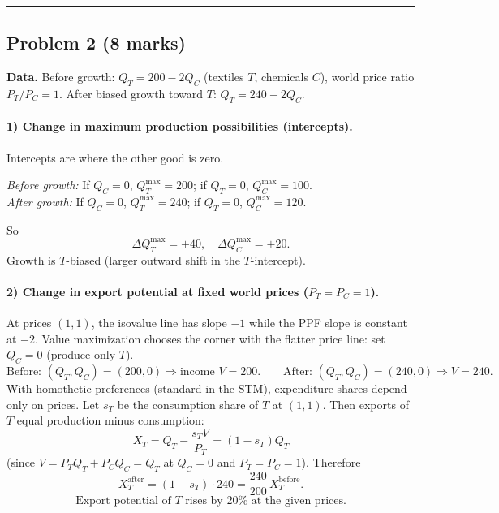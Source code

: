 \documentclass[12pt]{article}
\begin{document}
\bigskip
\hrule
\bigskip

\subsection*{Problem 2 (8 marks)}
\textbf{Data.} Before growth: $Q_T = 200 - 2Q_C$ (textiles $T$, chemicals $C$), world price ratio $P_T/P_C=1$. After biased growth toward $T$: $Q_T = 240 - 2Q_C$.

\paragraph{1) Change in maximum production possibilities (intercepts).}
Intercepts are where the other good is zero.

\textit{Before growth:} If $Q_C=0$, $Q_T^{\max}=200$; if $Q_T=0$, $Q_C^{\max}=100$.\\
\textit{After growth:} If $Q_C=0$, $Q_T^{\max}=240$; if $Q_T=0$, $Q_C^{\max}=120$.

So
\[
\boxed{\Delta Q_T^{\max}=+40,\quad \Delta Q_C^{\max}=+20.}
\]
Growth is $T$-biased (larger outward shift in the $T$-intercept).

\paragraph{2) Change in export potential at fixed world prices ($P_T=P_C=1$).}
At prices $(1,1)$, the isovalue line has slope $-1$ while the PPF slope is constant at $-2$. Value maximization chooses the corner with the flatter price line: set $Q_C=0$ (produce only $T$).
\[
\text{Before: } (Q_T,Q_C)=(200,0)\Rightarrow \text{income }V=200.
\qquad
\text{After: } (Q_T,Q_C)=(240,0)\Rightarrow V=240.
\]
With homothetic preferences (standard in the STM), expenditure shares depend only on prices. Let $s_T$ be the consumption share of $T$ at $(1,1)$. Then exports of $T$ equal production minus consumption:
\[
X_T = Q_T - \frac{s_T V}{P_T} = (1-s_T)Q_T
\]
(since $V=P_T Q_T + P_C Q_C = Q_T$ at $Q_C=0$ and $P_T=P_C=1$). Therefore
\[
X_T^{\text{after}} = (1-s_T)\cdot 240 = \frac{240}{200}\, X_T^{\text{before}}.
\]
\[
\boxed{\text{Export potential of }T\text{ rises by }20\% \text{ at the given prices.}}
\]
\end{document}
